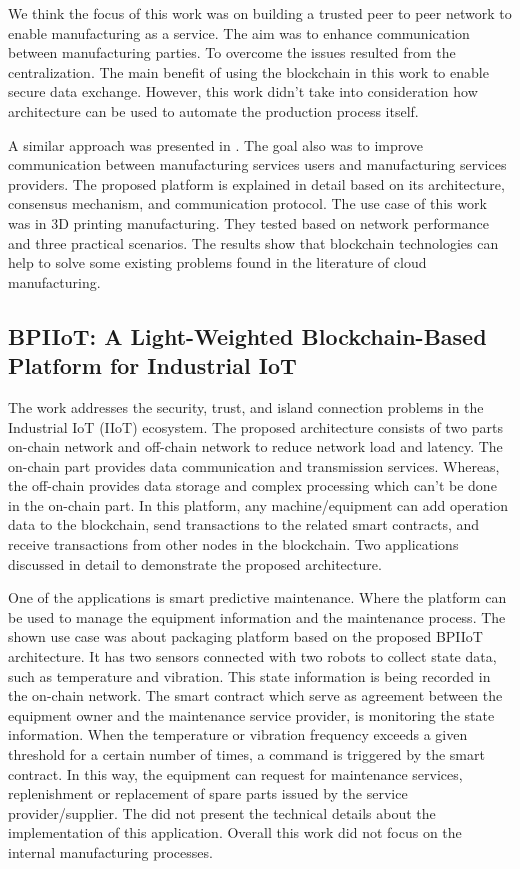 \documentclass[runningheads]{llncs}
\begin{document}
\noindent
We think the focus of this work was on building a trusted peer to peer network to enable manufacturing as a service. The aim was to enhance communication between manufacturing parties. To overcome the issues resulted from the centralization. The main benefit of using the blockchain in this work to enable secure data exchange. However, this work didn't take into consideration how architecture can be used to automate the production process itself. \bigbreak

\noindent
A similar approach was presented in \cite{Barenji2019}. The goal also was to improve communication between manufacturing services users and manufacturing services providers. The proposed platform is explained in detail based on its architecture, consensus mechanism, and communication protocol. The use case of this work was in 3D printing manufacturing. They tested based on network performance and three practical scenarios. The results show that blockchain technologies can help to solve some existing problems found in the literature of cloud manufacturing. 


\subsection{BPIIoT: A Light-Weighted Blockchain-Based
Platform for Industrial IoT \cite{Bai2019}}
The work addresses the security, trust, and island connection problems in the Industrial IoT (IIoT) ecosystem. The proposed architecture consists of two parts on-chain network and off-chain network to reduce network load and latency. The on-chain part provides data communication and transmission services. Whereas, the off-chain provides data storage and complex processing which can't be done in the on-chain part. In this platform, any machine/equipment can add operation data to the blockchain, send transactions to the related smart contracts, and receive transactions from other nodes in the blockchain. Two applications discussed in detail to demonstrate the proposed architecture.\bigbreak 

\noindent 
One of the applications is smart predictive maintenance. Where the platform can be used to manage the equipment information and the maintenance process. The shown use case was about packaging platform based on the proposed BPIIoT architecture. It has two sensors connected with two robots to collect state data, such as temperature and vibration. This state information is being recorded in the on-chain network. The smart contract which serve as agreement between the equipment owner and the maintenance service provider, is monitoring the state information. When the temperature or vibration frequency exceeds a given threshold for a certain number of times, a command is triggered by the smart contract. In this way, the equipment can request for maintenance services, replenishment or replacement of spare parts issued by the service provider/supplier. The did not present the technical details about the implementation of this application. Overall this work did not focus on the internal manufacturing processes. 
\end{document}

